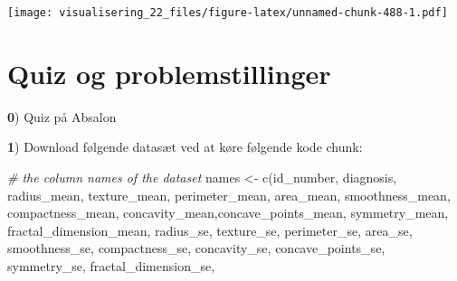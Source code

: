 \documentclass[
]{book}
\newenvironment{Shaded}{\begin{snugshade}}{\end{snugshade}}
\newcommand{\CommentTok}[1]{\textcolor[rgb]{0.56,0.35,0.01}{\textit{#1}}}
\newcommand{\FunctionTok}[1]{\textcolor[rgb]{0.00,0.00,0.00}{#1}}
\newcommand{\NormalTok}[1]{#1}
\newcommand{\OtherTok}[1]{\textcolor[rgb]{0.56,0.35,0.01}{#1}}
\newcommand{\StringTok}[1]{\textcolor[rgb]{0.31,0.60,0.02}{#1}}
\begin{document}
\texttt{[image: visualisering\_22\_files/figure-latex/unnamed-chunk-488-1.pdf]}

\hypertarget{quiz-og-problemstillinger}{%
\section{Quiz og problemstillinger}\label{quiz-og-problemstillinger}}

\textbf{0}) Quiz på Absalon

\textbf{1}) Download følgende datasæt ved at køre følgende kode chunk:

\begin{Shaded}
\begin{Highlighting}[]
\CommentTok{\# the column names of the dataset}
\NormalTok{names }\OtherTok{\textless{}{-}} \FunctionTok{c}\NormalTok{(}\StringTok{\textquotesingle{}id\_number\textquotesingle{}}\NormalTok{, }\StringTok{\textquotesingle{}diagnosis\textquotesingle{}}\NormalTok{, }\StringTok{\textquotesingle{}radius\_mean\textquotesingle{}}\NormalTok{, }
           \StringTok{\textquotesingle{}texture\_mean\textquotesingle{}}\NormalTok{, }\StringTok{\textquotesingle{}perimeter\_mean\textquotesingle{}}\NormalTok{, }\StringTok{\textquotesingle{}area\_mean\textquotesingle{}}\NormalTok{, }
           \StringTok{\textquotesingle{}smoothness\_mean\textquotesingle{}}\NormalTok{, }\StringTok{\textquotesingle{}compactness\_mean\textquotesingle{}}\NormalTok{, }
           \StringTok{\textquotesingle{}concavity\_mean\textquotesingle{}}\NormalTok{,}\StringTok{\textquotesingle{}concave\_points\_mean\textquotesingle{}}\NormalTok{, }
           \StringTok{\textquotesingle{}symmetry\_mean\textquotesingle{}}\NormalTok{, }\StringTok{\textquotesingle{}fractal\_dimension\_mean\textquotesingle{}}\NormalTok{,}
           \StringTok{\textquotesingle{}radius\_se\textquotesingle{}}\NormalTok{, }\StringTok{\textquotesingle{}texture\_se\textquotesingle{}}\NormalTok{, }\StringTok{\textquotesingle{}perimeter\_se\textquotesingle{}}\NormalTok{, }
           \StringTok{\textquotesingle{}area\_se\textquotesingle{}}\NormalTok{, }\StringTok{\textquotesingle{}smoothness\_se\textquotesingle{}}\NormalTok{, }\StringTok{\textquotesingle{}compactness\_se\textquotesingle{}}\NormalTok{, }
           \StringTok{\textquotesingle{}concavity\_se\textquotesingle{}}\NormalTok{, }\StringTok{\textquotesingle{}concave\_points\_se\textquotesingle{}}\NormalTok{, }
           \StringTok{\textquotesingle{}symmetry\_se\textquotesingle{}}\NormalTok{, }\StringTok{\textquotesingle{}fractal\_dimension\_se\textquotesingle{}}\NormalTok{, }

\end{Highlighting}
\end{Shaded}
\end{document}
